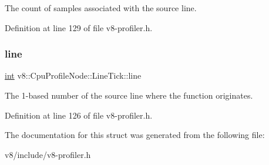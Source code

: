 The count of samples associated with the source line. 

Definition at line 129 of file v8-\/profiler.\+h.

\mbox{\label{structv8_1_1CpuProfileNode_1_1LineTick_af96fbdefbc07b2c84cf41d74555626f6}} 
\subsubsection{\texorpdfstring{line}{line}}
{\footnotesize\ttfamily \mbox{\hyperlink{classint}{int}} v8\+::\+Cpu\+Profile\+Node\+::\+Line\+Tick\+::line}

The 1-\/based number of the source line where the function originates. 

Definition at line 126 of file v8-\/profiler.\+h.



The documentation for this struct was generated from the following file\+:\begin{DoxyCompactItemize}
\item 
v8/include/v8-\/profiler.\+h\end{DoxyCompactItemize}
